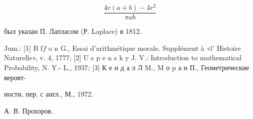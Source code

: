 \documentclass[10pt]{article}
\begin{document}
\[

\frac{4 r(a+b)-4 r^{2}}{\pi a b}

\]



был указан П. Лапласом (Р. Laplace) в 1812.



Jum.: [1] B $\mathrm{f} f$ o $\mathrm{n}$ G., Essai d'arithmétique morale. Supplément à «l' Histoire Naturelle», v. 4, 1777; [2] U s p e n s k y J. V.: Introduction to mathematical Probability, N. Y.- L., 1937; [3] К е н д а л Л M., M о $\mathrm{p}$ а н П., Геометрические вероят-

ности, пер. с англ., М., 1972.

А. В. Прохоров.
\end{document}
